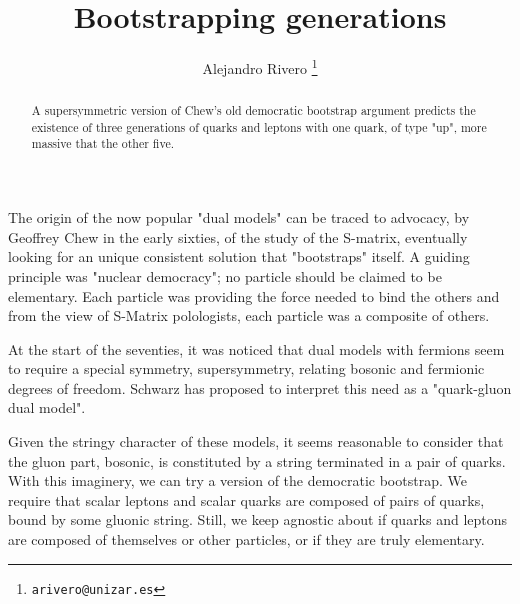 \documentclass[10pt]{article}
\begin{document}
 

\author{Alejandro Rivero \thanks{\texttt{arivero@unizar.es}}}



 

\title{Bootstrapping generations}
 
 \maketitle 
\begin{abstract}
A supersymmetric version of Chew's old democratic bootstrap argument
predicts the existence of three generations of quarks and leptons with one
quark, of type "up", more massive that the other five. 
\end{abstract}


 

The origin of the now popular "dual models" can be traced to advocacy,
by Geoffrey Chew in the early sixties, of the study of the S-matrix, 
eventually looking for an unique consistent solution that "bootstraps" 
itself. A guiding principle was "nuclear democracy"; no particle
should be claimed to be elementary. Each particle was 
providing the force needed to bind the others \cite{Chew:1963zza,PhysRevLett.7.394}
and from the view of S-Matrix polologists, each particle
was a composite of others. 

At the start of the seventies, it was noticed that dual models 
with fermions \cite{Ramond:1971gb, Neveu:1971iv} seem to require
a special symmetry, supersymmetry, relating bosonic and
fermionic degrees of freedom. Schwarz \cite{Schwarz:1972hg} has proposed to interpret this need as a "quark-gluon dual model". 

Given the stringy character
of these models, it seems reasonable to consider that the
gluon part, bosonic, is constituted by a string terminated in
a pair of quarks. With this imaginery, we can try a 
version of the democratic bootstrap. We require that scalar
leptons and scalar quarks are
composed of pairs of quarks, bound by some gluonic string.
Still, we keep agnostic about if quarks and leptons
are composed of themselves or other particles, or if
they are truly elementary.
\end{document}
